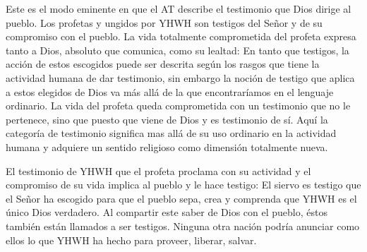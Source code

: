 Este es el modo eminente en que el AT describe el testimonio que Dios dirige al
pueblo. Los profetas y ungidos por YHWH son testigos del Señor y de su
compromiso con el pueblo. La vida totalmente comprometida del profeta expresa
tanto a Dios, absoluto que comunica, como su lealtad:
En tanto que testigos, la acción de estos escogidos puede ser descrita según los
rasgos que tiene la actividad humana de dar testimonio, sin embargo la noción de
testigo que aplica a estos elegidos de Dios va más allá de la que encontraríamos
en el lenguaje ordinario. La vida del profeta queda comprometida con un
testimonio que no le pertenece, sino que \autocite[118]{prades2015testimonio} puesto que viene de Dios y es
testimonio de sí. Aquí la categoría de testimonio significa mas allá de su uso
ordinario en la actividad humana y adquiere un sentido religioso como dimensión
totalmente nueva\autocite[Cf.][118]{prades2015testimonio}.

El testimonio de YHWH que el profeta proclama con su actividad y el compromiso
de su vida implica al pueblo y le hace testigo:
El siervo es testigo que el Señor ha escogido para que el pueblo sepa, crea y
comprenda que YHWH es el único Dios verdadero. Al compartir este saber de Dios
con el pueblo, éstos también están llamados a ser testigos. Ninguna otra nación
podría anunciar como ellos lo que YHWH ha hecho para proveer, liberar, salvar.

